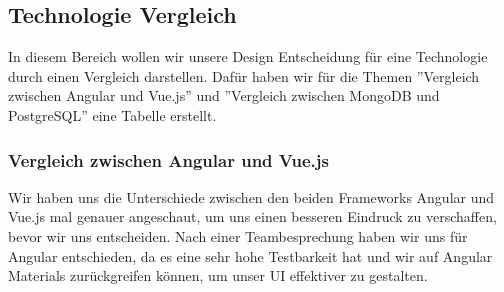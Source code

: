 \subsection{Technologie Vergleich}
In diesem Bereich wollen wir unsere Design Entscheidung für eine Technologie durch einen Vergleich darstellen.
Dafür haben wir für die Themen ''Vergleich zwischen Angular und Vue.js'' und ''Vergleich zwischen MongoDB und PostgreSQL'' eine Tabelle erstellt.

\subsubsection{Vergleich zwischen Angular und Vue.js}

Wir haben uns die Unterschiede zwischen den beiden Frameworks Angular und Vue.js mal genauer angeschaut, 
um uns einen besseren Eindruck zu verschaffen, bevor wir uns entscheiden.
Nach einer Teambesprechung haben wir uns für Angular entschieden, da es eine sehr hohe Testbarkeit hat 
und wir auf Angular Materials zurückgreifen können, um unser UI effektiver zu gestalten.

